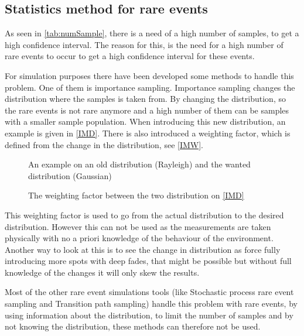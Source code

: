 \newpage
\subsection{Statistics method for rare events}\label{sampleEQ}
As seen in \autoref{tab:numSample}, there is a need of a high number of samples, to get a high confidence interval. The reason for this, is the need for a high number of rare events to occur to get a high confidence interval for these events. 

For simulation purposes there have been developed some methods to handle this problem. One of them is importance sampling. Importance sampling changes the distribution where the samples is taken from. By changing the distribution, so the rare events is not rare anymore and a high number of them can be samples with a smaller sample population. When introducing this new distribution, an example is given in \autoref{IMD}. There is also introduced a weighting factor, which is defined from the change in the distribution, see \autoref{IMW}. 

\begin{minipage}[t]{0.48\textwidth}
\centering
\begin{figure}[H]

\caption{An example on an old distribution (Rayleigh) and the wanted distribution (Gaussian)}
\label{IMD}
\end{figure}
\end{minipage}%
\hspace{0.03\textwidth}
\begin{minipage}[t]{0.48\textwidth}
\centering
\begin{figure}[H]

\caption{The weighting factor between the two distribution on \autoref{IMD}}
\label{IMW}
\end{figure}
\end{minipage}
\vspace{1em}

This weighting factor is used to go from the actual distribution to the desired distribution. However this can not be used as the measurements are taken physically with no a priori knowledge of the behaviour of the environment. Another way to look at this is to see the change in distribution as force fully introducing more spots with deep fades, that might be possible but without full knowledge of the changes it will only skew the results.

Most of the other rare event simulations tools (like Stochastic process rare event sampling and Transition path sampling) handle this problem with rare events, by using information about the distribution, to limit the number of samples and by not knowing the distribution, these methods can therefore not be used. 


